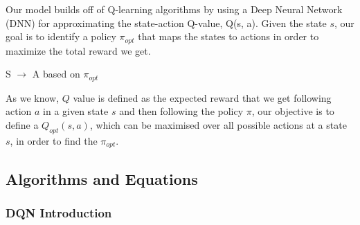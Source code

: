 Our model builds off of Q-learning algorithms by using a Deep Neural Network (DNN) for approximating the state-action Q-value, Q(s, a). 
Given the state $s$, our goal is to identify a policy $\pi_{opt}$ that maps the states to actions in order to maximize the total reward we get.

\begin{center}
S $\rightarrow$ A based on $\pi_{opt}$
\end{center}

As we know, $Q$ value is defined as the expected reward that we get following action $a$ in a given state $s$ and then following the policy $\pi$, our objective is to define a $Q_{opt} (s, a)$, which can be maximised over all possible actions at a state $s$, in order to find the $\pi_{opt}$.

\subsection{Algorithms and Equations}

\subsubsection{DQN Introduction}

